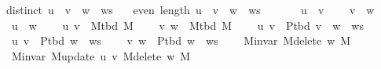 \begin{isabellebody}
\ \ \ {\isachardoublequoteopen}distinct\ {\isacharparenleft}{\kern0pt}u\ {\isacharhash}{\kern0pt}\ v\ {\isacharhash}{\kern0pt}\ w\ {\isacharhash}{\kern0pt}\ ws{\isacharparenright}{\kern0pt}{\isachardoublequoteclose}\isanewline
\ \ \ {\isachardoublequoteopen}even\ {\isacharparenleft}{\kern0pt}length\ {\isacharparenleft}{\kern0pt}u\ {\isacharhash}{\kern0pt}\ v\ {\isacharhash}{\kern0pt}\ w\ {\isacharhash}{\kern0pt}\ ws{\isacharparenright}{\kern0pt}{\isacharparenright}{\kern0pt}{\isachardoublequoteclose}\isanewline
\ \ \isanewline
\ \ \ \ {\isachardoublequoteopen}u\ {\isasymnoteq}\ v{\isachardoublequoteclose}\isanewline
\ \ \ \ {\isachardoublequoteopen}v\ {\isasymnoteq}\ w{\isachardoublequoteclose}\isanewline
\ \ \ \ {\isachardoublequoteopen}u\ {\isasymnoteq}\ w{\isachardoublequoteclose}\isanewline
\ \ \ \ {\isachardoublequoteopen}{\isacharbraceleft}{\kern0pt}u{\isacharcomma}{\kern0pt}\ v{\isacharbraceright}{\kern0pt}\ {\isasymnotin}\ M{\isacharunderscore}{\kern0pt}tbd\ M{\isachardoublequoteclose}\isanewline
\ \ \ \ {\isachardoublequoteopen}{\isacharbraceleft}{\kern0pt}v{\isacharcomma}{\kern0pt}\ w{\isacharbraceright}{\kern0pt}\ {\isasymin}\ M{\isacharunderscore}{\kern0pt}tbd\ M{\isachardoublequoteclose}\isanewline
\ \ \ \ {\isachardoublequoteopen}{\isacharbraceleft}{\kern0pt}u{\isacharcomma}{\kern0pt}\ v{\isacharbraceright}{\kern0pt}\ {\isasymnotin}\ P{\isacharunderscore}{\kern0pt}tbd\ {\isacharparenleft}{\kern0pt}v\ {\isacharhash}{\kern0pt}\ w\ {\isacharhash}{\kern0pt}\ ws{\isacharparenright}{\kern0pt}{\isachardoublequoteclose}\isanewline
\ \ \ \ {\isachardoublequoteopen}{\isacharbraceleft}{\kern0pt}u{\isacharcomma}{\kern0pt}\ v{\isacharbraceright}{\kern0pt}\ {\isasymnotin}\ P{\isacharunderscore}{\kern0pt}tbd\ {\isacharparenleft}{\kern0pt}w\ {\isacharhash}{\kern0pt}\ ws{\isacharparenright}{\kern0pt}{\isachardoublequoteclose}\isanewline
\ \ \ \ {\isachardoublequoteopen}{\isacharbraceleft}{\kern0pt}v{\isacharcomma}{\kern0pt}\ w{\isacharbraceright}{\kern0pt}\ {\isasymnotin}\ P{\isacharunderscore}{\kern0pt}tbd\ {\isacharparenleft}{\kern0pt}w\ {\isacharhash}{\kern0pt}\ ws{\isacharparenright}{\kern0pt}{\isachardoublequoteclose}\isanewline
\ \ \ \ {\isachardoublequoteopen}M{\isachardot}{\kern0pt}invar\ {\isacharparenleft}{\kern0pt}M{\isacharunderscore}{\kern0pt}delete\ w\ M{\isacharparenright}{\kern0pt}{\isachardoublequoteclose}\isanewline
\ \ \ \ {\isachardoublequoteopen}M{\isachardot}{\kern0pt}invar\ {\isacharparenleft}{\kern0pt}M{\isacharunderscore}{\kern0pt}update\ u\ v\ {\isacharparenleft}{\kern0pt}M{\isacharunderscore}{\kern0pt}delete\ w\ M{\isacharparenright}{\kern0pt}{\isacharparenright}{\kern0pt}{\isachardoublequoteclose}\isanewline

\end{isabellebody}
